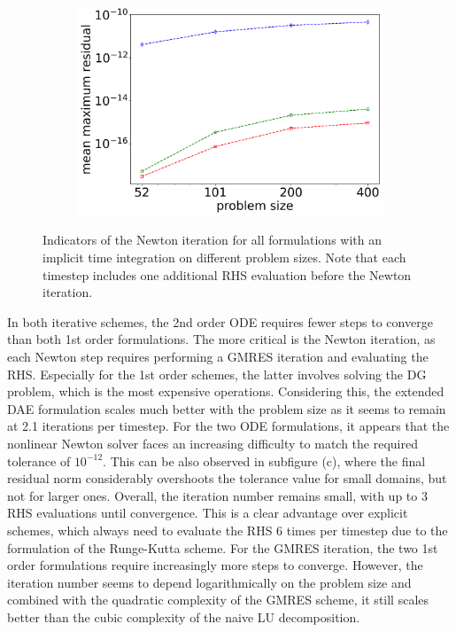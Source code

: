 \begin{figure}[H]
\begin{subfigure}[b]{0.32\textwidth}
	\end{subfigure}
	\begin{subfigure}[b]{0.32\textwidth}
		\centering
		\includegraphics[width=1\textwidth]{images/TANDEM_maximumResidualNorm.png}
	\end{subfigure}
	\caption{Indicators of the Newton iteration for all formulations with an implicit time integration on different problem sizes. Note that each timestep includes one additional RHS evaluation before the Newton iteration.}
	\label{fig:implicit_methods_scalabilty_iterations}
\end{figure}

In both iterative schemes, the 2nd order ODE requires fewer steps to converge than both 1st order formulations. The more critical is the Newton iteration, as each Newton step requires performing a GMRES iteration and evaluating the RHS. Especially for the 1st order schemes, the latter involves solving the DG problem, which is the most expensive operations. Considering this, the extended DAE formulation scales much better with the problem size as it seems to remain at 2.1 iterations per timestep. For the two ODE formulations, it appears that the nonlinear Newton solver faces an increasing difficulty to match the required tolerance of $10^{-12}$. This can be also observed in subfigure (c), where the final residual norm considerably overshoots the tolerance value for small domains, but not for larger ones. Overall, the iteration number remains small, with up to 3 RHS evaluations until convergence. This is a clear advantage over explicit schemes, which always need to evaluate the RHS 6 times per timestep due to the formulation of the Runge-Kutta scheme. For the GMRES iteration, the two 1st order formulations require increasingly more steps to converge. However, the iteration number seems to depend logarithmically on the problem size and combined with the quadratic complexity of the GMRES scheme, it still scales better than the cubic complexity of the naive LU decomposition. 


